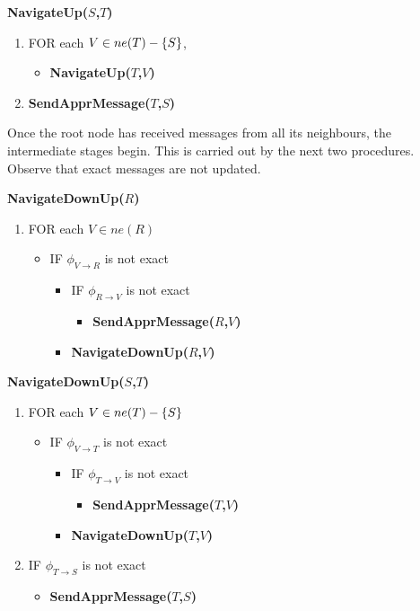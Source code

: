 \bigskip\noindent
\textsf{\textbf{NavigateUp($S$,$T$)}}

\begin{enumerate}
\item FOR each $V\in ne(T)-{\{S\}}$,
  \begin{itemize}
  \item \textsf{\textbf{NavigateUp($T$,$V$)}}
  \end{itemize}
\item \textsf{\textbf{SendApprMessage($T$,$S$)}}
\end{enumerate}


Once the root node has received  messages from all its neighbours, the
intermediate stages begin. This is carried out by the next two
procedures. Observe that exact messages are not updated.

\bigskip\noindent
\textsf{\textbf{NavigateDownUp($R$)}}

\begin{enumerate}
\item FOR each $V\in ne(R)$
  
  \begin{itemize}
  \item[] IF $\phi_{V\rightarrow R}$ is not exact
    \begin{itemize}
    \item[] IF $\phi_{R\rightarrow V}$ is not exact
      \begin{itemize}
      \item[] \textsf{\textbf{SendApprMessage($R$,$V$)}}
      \end{itemize}
    \item[] \textsf{\textbf{NavigateDownUp($R$,$V$)}}
    \end{itemize}
  \end{itemize}
\end{enumerate}


\bigskip\noindent
\textsf{\textbf{NavigateDownUp($S$,$T$)}}

\begin{enumerate}
\item FOR each $V\in ne(T)-{\{S\}}$
  \begin{itemize}
  \item[] IF $\phi_{V\rightarrow T}$ is not exact
    \begin{itemize}
    \item[] IF $\phi_{T\rightarrow V}$ is not exact
      \begin{itemize}
      \item[] \textsf{\textbf{SendApprMessage($T$,$V$)}}
      \end{itemize}
    \item[] \textsf{\textbf{NavigateDownUp($T$,$V$)}}
    \end{itemize}
  \end{itemize}
  
\item IF $\phi_{T\rightarrow S}$ is not exact
  \begin{itemize}
  \item[] \textsf{\textbf{SendApprMessage($T$,$S$)}}
  \end{itemize}
\end{enumerate}


